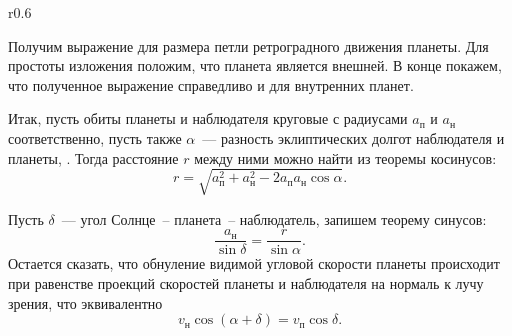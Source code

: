 \begin{wrapfigure}[13]{r}{0.6\tw}
    \caption{}
    \label{pic:retrograde-movement-schema}
\end{wrapfigure}

Получим выражение для размера петли ретроградного движения планеты. Для простоты изложения положим, что планета является внешней. В конце покажем, что полученное выражение справедливо и для внутренних планет. 

Итак, пусть обиты планеты и наблюдателя круговые с радиусами $a_\text{п}$ и  $a_\text{н}$ соответственно, пусть также $\alpha$~--- разность эклиптических долгот наблюдателя и планеты, . Тогда расстояние $r$ между ними можно найти из теоремы косинусов:
\begin{equation}
    r = \sqrt{a_\text{п}^2 + a_\text{н}^2 - 2 a_\text{п} a_\text{н} \cos \alpha}.
    \label{eq:retrograde-movement-distance}
\end{equation}

Пусть $\delta$~--- угол Солнце~-- планета~-- наблюдатель, запишем теорему синусов:
\begin{equation}
    \frac{a_\text{н}}{\sin \delta} = \frac{r}{\sin \alpha}.
    \label{eq:retrograde-movement-sinuses-theorem}
\end{equation}
Остается сказать, что обнуление видимой угловой скорости планеты происходит при равенстве проекций скоростей планеты и наблюдателя на нормаль к лучу зрения, что эквивалентно
\begin{equation}
    v_\text{н} \cos (\alpha + \delta) = v_\text{п} \cos \delta.
    \label{eq:retrograde-movement-velocity-projectione-equivalence}
\end{equation}

